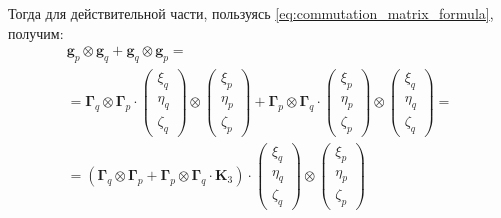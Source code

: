 Тогда для действительной части, пользуясь \ref{eq:commutation_matrix_formula}, получим:
\begin{multline}
    \mathbf{g}_p \otimes \mathbf{g}_q + \mathbf{g}_q \otimes \mathbf{g}_p = \\
    =
    \mathbf{\Gamma}_q
    \otimes
    \mathbf{\Gamma}_p
    \cdot
    \left(\begin{array}{ccc}
            \xi_q\\
            \eta_q\\
            \zeta_q
        \end{array}
    \right)
    \otimes
    \left(\begin{array}{ccc}
            \xi_p\\
            \eta_p\\
            \zeta_p
        \end{array}
    \right) +
    \mathbf{\Gamma}_p
    \otimes
    \mathbf{\Gamma}_q
    \cdot
    \left(\begin{array}{ccc}
            \xi_p\\
            \eta_p\\
            \zeta_p
        \end{array}
    \right)
    \otimes
    \left(\begin{array}{ccc}
            \xi_q\\
            \eta_q\\
            \zeta_q
        \end{array}
    \right) = \\
    =  \left(
        \mathbf{\Gamma}_q
    \otimes
    \mathbf{\Gamma}_p
  +
  \mathbf{\Gamma}_p
    \otimes
    \mathbf{\Gamma}_q
    \cdot
    \mathbf{K}_3
    \right)
    \cdot
    \left(\begin{array}{ccc}
            \xi_q\\
            \eta_q\\
            \zeta_q
        \end{array}
    \right)
    \otimes
    \left(\begin{array}{ccc}
            \xi_p\\
            \eta_p\\
            \zeta_p
        \end{array}
    \right)
\end{multline}

